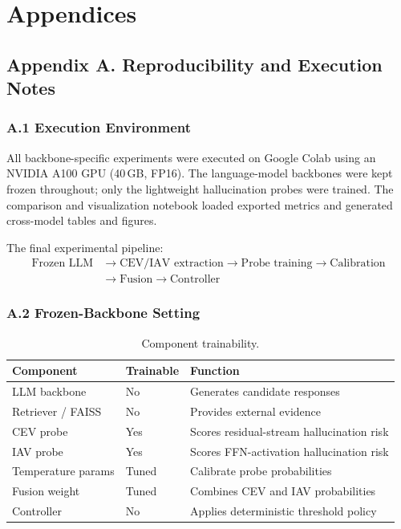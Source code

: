 \clearpage
\appendix

\captionsetup[table]{list=no}
\captionsetup[figure]{list=no}

\chapter*{Appendices}

\section*{Appendix A. Reproducibility and Execution Notes}

\subsection*{A.1 Execution Environment}

All backbone-specific experiments were executed on Google Colab using an NVIDIA A100 GPU (40\,GB, FP16). The language-model backbones were kept frozen throughout; only the lightweight hallucination probes were trained. The comparison and visualization notebook loaded exported metrics and generated cross-model tables and figures.

The final experimental pipeline:
\[
\begin{aligned}
\text{Frozen LLM} 
&\to \text{CEV/IAV extraction} 
\to \text{Probe training} 
\to \text{Calibration} \\
&\to \text{Fusion} 
\to \text{Controller}
\end{aligned}
\]

\subsection*{A.2 Frozen-Backbone Setting}

\begin{table}[!htb]
\centering
\caption*{Component trainability.}
\begin{tabular}{@{}llp{7cm}@{}}
\toprule
\textbf{Component} & \textbf{Trainable} & \textbf{Function} \\
\midrule
LLM backbone        & No    & Generates candidate responses \\
Retriever / FAISS   & No    & Provides external evidence \\
CEV probe           & Yes   & Scores residual-stream hallucination risk \\
IAV probe           & Yes   & Scores FFN-activation hallucination risk \\
Temperature params  & Tuned & Calibrate probe probabilities \\
Fusion weight       & Tuned & Combines CEV and IAV probabilities \\
Controller          & No    & Applies deterministic threshold policy \\
\bottomrule
\end{tabular}
\end{table}

